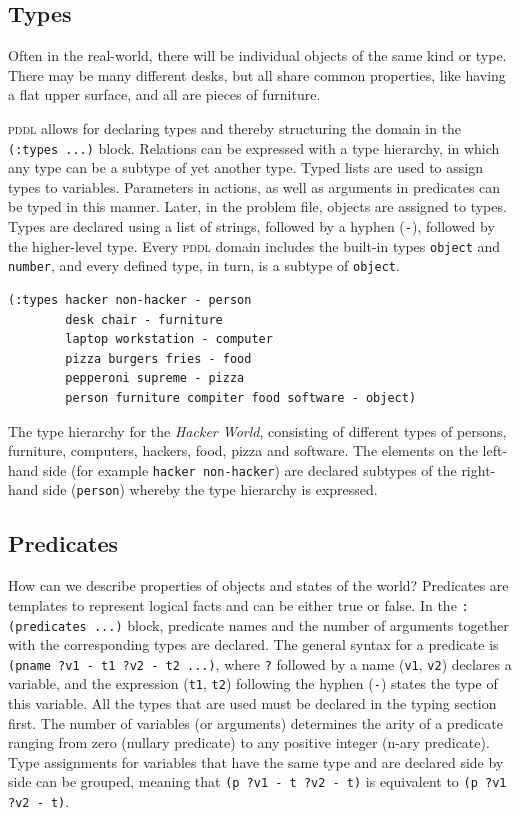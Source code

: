 \documentclass[a4paper,12pt]{report}
\newcommand{\pddl}{\textsc{pddl}\xspace}
\begin{document}
\subsection{Types}
\label{sec-2-2-3}
\label{subsubsec:types}
Often in the real-world, there will be individual objects of the same
kind or type. There may be many different desks, but all share
common properties, like having a flat upper surface, and all are
pieces of furniture.

\pddl allows for declaring types and thereby structuring the
domain in the \texttt{(:types ...)} block. Relations can be expressed with a
type hierarchy, in which any type can be a subtype of yet another
type. Typed lists are used to assign types to variables.
Parameters in actions, as well as arguments in predicates can be typed
in this manner. Later, in the problem file, objects are assigned to
types. Types are declared using a list of strings, followed by a
hyphen (\texttt{-}), followed by the higher-level type. Every \pddl
domain includes the built-in types \texttt{object} and \texttt{number}, and every
defined type, in turn, is a subtype of \texttt{object}.

\begin{listing}[H]
\begin{verbatim}
(:types hacker non-hacker - person
        desk chair - furniture
        laptop workstation - computer
        pizza burgers fries - food
        pepperoni supreme - pizza
        person furniture compiter food software - object)
\end{verbatim}
\caption{The type hierarchy for the \emph{Hacker World}, consisting of different types of persons, furniture, computers, hackers, food, pizza and software. The elements on the left-hand side (for example \texttt{hacker non-hacker}) are declared subtypes of the right-hand side (\texttt{person}) whereby the type hierarchy is expressed.}
\end{listing}
\subsection{Predicates}
\label{sec-2-2-4}

How can we describe properties of objects and states of the world?
Predicates are templates to represent logical facts and can be either
true or false. In the \texttt{:(predicates ...)} block, predicate names and
the number of arguments together with the corresponding types are
declared. The general syntax for a predicate is \texttt{(pname ?v1 - t1 ?v2 -
t2 ...)}, where \texttt{?} followed by a name (\texttt{v1}, \texttt{v2}) declares a
variable, and the expression (\texttt{t1}, \texttt{t2}) following the hyphen (\texttt{-})
states the type of this variable. All the types that are used must be
declared in the typing section first. The number of variables (or
arguments) determines the arity of a predicate ranging from zero
(nullary predicate) to any positive integer (n-ary predicate). Type
assignments for variables that have the same type and are declared
side by side can be grouped, meaning that \texttt{(p ?v1 - t ?v2 - t)} is
equivalent to \texttt{(p ?v1 ?v2 - t)}.
\end{document}
